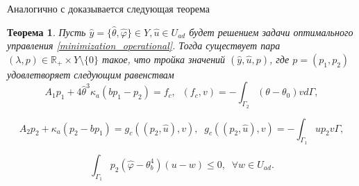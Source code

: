 \documentclass[12pt,a4paper]{article}%
\newtheorem{theorem}{Теорема}
\begin{document}
    Аналогично с \cite{theorem_2_proof} доказывается следующая теорема
    \begin{theorem}
        Пусть $\hat{y}=\{\hat{\theta},\hat{\varphi} \} \in Y, \hat{u} \in U_{ad}$ будет решением задачи оптимального управления \eqref{minimization_operational}. Тогда существует пара $(\lambda, p) \in \mathbb{R}_{+} \times Y \setminus \{0\}$
        такое, что тройка значений $(\hat{y}, \hat{u}, p)$, где $p = (p_1, p_2)$ удовлетворяет следующим равенствам
        \begin{equation}
        \label{therorem_2_eq1}
         A_1 p_1 + 4 \hat{\theta}^3 \kappa_a(b p_1 - p_2) = f_c, \;\; (f_c,v) = - \int_{\Gamma_2} (\theta - \theta_0) v d\Gamma,
        \end{equation}

        \begin{equation}
        \label{therorem_2_eq2}
        A_2 p_2 + \kappa_a (p_2-b p_1) = g_c(( p_2, \hat{u}),v), \; \; g_c(( p_2, \hat{u}),v) = - \int_{\Gamma_1} u p_2 v\Gamma,
        \end{equation}

        \begin{equation}
        \label{therorem_2_eq3}
        \int_{\Gamma_1} p_2 (\hat{\varphi} - \theta_b^4)(u-w) \leq 0, \; \; \forall w \in U_{ad}.
        \end{equation}

    \end{theorem}
\end{document}
